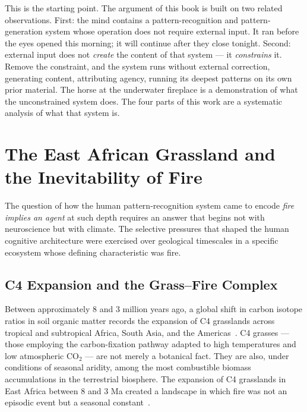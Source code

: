 This is the starting point. The argument of this book is built on two related observations. First: the mind contains a pattern-recognition and pattern-generation system whose operation does not require external input. It ran before the eyes opened this morning; it will continue after they close tonight. Second: external input does not \textit{create} the content of that system --- it \textit{constrains} it. Remove the constraint, and the system runs without external correction, generating content, attributing agency, running its deepest patterns on its own prior material. The horse at the underwater fireplace is a demonstration of what the unconstrained system does. The four parts of this work are a systematic analysis of what that system is.

\bigskip

\section{The East African Grassland and the Inevitability of Fire}

The question of how the human pattern-recognition system came to encode \textit{fire implies an agent} at such depth requires an answer that begins not with neuroscience but with climate. The selective pressures that shaped the human cognitive architecture were exercised over geological timescales in a specific ecosystem whose defining characteristic was fire.

\subsection{C4 Expansion and the Grass--Fire Complex}

Between approximately 8 and 3 million years ago, a global shift in carbon isotope ratios in soil organic matter records the expansion of C4 grasslands across tropical and subtropical Africa, South Asia, and the Americas~\cite{cerling1997}. C4 grasses --- those employing the carbon-fixation pathway adapted to high temperatures and low atmospheric $\mathrm{CO}_2$ --- are not merely a botanical fact. They are also, under conditions of seasonal aridity, among the most combustible biomass accumulations in the terrestrial biosphere. The expansion of C4 grasslands in East Africa between 8 and 3 Ma created a landscape in which fire was not an episodic event but a seasonal constant~\cite{bobe2004}.

